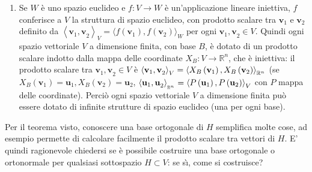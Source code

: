 \documentclass{article}
\begin{document}
\begin{enumerate}
\item Se $W$ \`{e} uno spazio euclideo e $f:V\rightarrow W$ \`{e}
un'applicazione lineare iniettiva, $f$ conferisce a $V$ la struttura di
spazio euclideo, con prodotto scalare tra $\mathbf{v}_{1}$ e $\mathbf{v}_{2}$
definito da $\left\langle \mathbf{v}_{1}\mathbf{,v}_{2}\right\rangle
_{V}=\langle f\left( \mathbf{v}_{1}\right) \mathbf{,}f\left( \mathbf{v}%
_{2}\right) \mathbf{\rangle }_{W}$ per ogni $\mathbf{v}_{1}\mathbf{,v}%
_{2}\in V$. Quindi ogni spazio vettoriale $V$ a dimensione finita, con base $%
B$, \`{e} dotato di un prodotto scalare indotto dalla mappa delle coordinate 
$X_{B}:V\rightarrow 
\mathbb{R}
^{n}$, che \`{e} iniettiva: il prodotto scalare tra $\mathbf{v}_{1}\mathbf{,v%
}_{2}\in V$ \`{e} $\left\langle \mathbf{v}_{1}\mathbf{,v}_{2}\right\rangle
_{V}=\left\langle X_{B}\left( \mathbf{v}_{1}\right) ,X_{B}\left( \mathbf{v}%
_{2}\right) \right\rangle _{%
\mathbb{R}
^{n}}$ (se $X_{B}\left( \mathbf{v}_{1}\right) =\mathbf{u}_{1},X_{B}\left( 
\mathbf{v}_{2}\right) =\mathbf{u}_{2}$, $\left\langle \mathbf{u}_{1}\mathbf{%
,u}_{2}\right\rangle _{_{%
\mathbb{R}
^{n}}}=\left\langle P\left( \mathbf{u}_{1}\right) ,P\left( \mathbf{u}%
_{2}\right) \right\rangle _{V}$ con $P$ mappa delle coordinate). Perci\`{o}
ogni spazio vettoriale $V$ a dimensione finita pu\`{o} essere dotato di
infinite strutture di spazio euclideo (una per ogni base).
\end{enumerate}

Per il teorema visto, conoscere una base ortogonale di $H$ semplifica molte
cose, ad esempio permette di calcolare facilmente il prodotto scalare tra
vettori di $H$. E' quindi ragionevole chiedersi se \`{e} possibile costruire
una base ortogonale o ortonormale per qualsiasi sottospazio $H\subset V$: se
s\`{\i}, come si costruisce?
\end{document}
